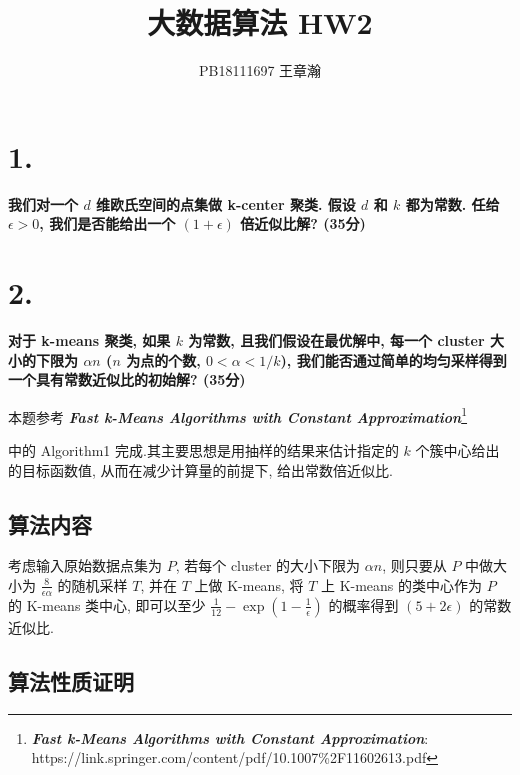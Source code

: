 \documentclass[UTF8]{article}
\title{大数据算法 HW2}
\author{PB18111697 王章瀚}
\newcommand{\jumpLine} {\hspace*{\fill} \par}
\begin{document}
\maketitle
\section*{1.}

\noindent \textbf{我们对一个 $d$ 维欧氏空间的点集做 k-center 聚类. 假设 $d$ 和 $k$ 都为常数. 任给 $\epsilon > 0$, 我们是否能给出一个 $(1 + \epsilon)$ 倍近似比解? (35分)}

\section*{2.}

\noindent \textbf{对于 k-means 聚类, 如果 $k$ 为常数, 且我们假设在最优解中, 每一个 cluster 大小的下限为 $\alpha n$ ($n$ 为点的个数, $0 < \alpha < 1/k$), 我们能否通过简单的均匀采样得到一个具有常数近似比的初始解? (35分)} \\\jumpLine\noindent

本题参考 \textbf{\textit{Fast k-Means Algorithms with Constant Approximation}}\footnote{\textbf{\textit{Fast k-Means Algorithms with Constant Approximation}}: https://link.springer.com/content/pdf/10.1007\%2F11602613.pdf
}

中的 Algorithm1 完成.其主要思想是用抽样的结果来估计指定的 $k$ 个簇中心给出的目标函数值, 从而在减少计算量的前提下, 给出常数倍近似比. 

\subsection*{算法内容}
考虑输入原始数据点集为 $P$, 若每个 cluster 的大小下限为 $\alpha n$, 则只要从 $P$ 中做大小为 $\frac{8}{\epsilon\alpha}$ 的随机采样 $T$, 并在 $T$ 上做 K-means, 将 $T$ 上 K-means 的类中心作为 $P$ 的 K-means 类中心, 即可以至少 $\frac{1}{12} - \exp(1-\frac{1}{\epsilon})$ 的概率得到 $(5+2\epsilon)$ 的常数近似比.

\subsection*{算法性质证明}
\end{document}
